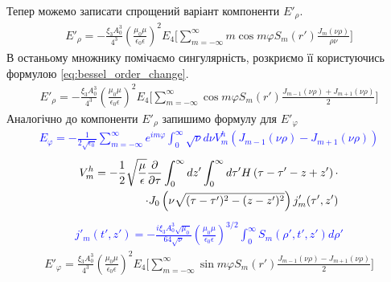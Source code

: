 %
Тепер можемо записати спрощений варіант 
компоненти $ E'_\rho $.
%
\begin{equation*} \begin{aligned}
E'_\rho = - \frac{\xi_3 A_0^3}{4^3}
\left( \frac{\mu_0 \mu} {\epsilon_0 \epsilon} \right)^2
E_4 \Big[ \sum_{m=-\infty}^\infty m \cos m \varphi 
S_m (r') \frac{J_m(\nu \rho)}{\rho \nu} \Big]
\end{aligned} \end{equation*}
%
В останьому множнику помічаємо сингулярність, розкриємо її користуючись
формулою \eqref{eq:bessel_order_change}.
%
\begin{equation*} \begin{aligned}
E'_\rho = - \frac{\xi_3 A_0^3}{4^3}
\left( \frac{\mu_0 \mu} {\epsilon_0 \epsilon} \right)^2
E_4 \Big[ \sum_{m=-\infty}^\infty \cos m \varphi 
S_m (r') \frac{J_{m-1}(\nu \rho) + J_{m+1}(\nu \rho)}{2} \Big]
\end{aligned} \end{equation*}
%
Аналогічно до компоненти $ E'_\rho $ запишимо формулу для $ E'_\varphi $
%
\textcolor{blue} { \begin{equation*} \begin{aligned}
E_\varphi = - \frac{1}{2 \sqrt{\epsilon_0}} \sum_{m=-\infty}^{\infty} 
e^{im\varphi} \int_{0}^{\infty} \sqrt{\nu} d \nu 
V_m^h \left( J_{m-1} (\nu \rho) - J_{m+1} (\nu \rho) \right)
\end{aligned} \end{equation*} }
%
\textcolor{blue} { \begin{equation*} \begin{aligned} 
V_m^h = - \frac{1}{2} \sqrt{\frac{\mu}{\epsilon}} \frac{\partial }{\partial \tau} 
\int_0^\infty dz' \int_0^\infty d \tau'
H \left( \tau - \tau' - z + z' \right) \cdot \\
\cdot J_0 \left( \nu \sqrt{(\tau-\tau')^2 - (z-z')^2} \right) j'_m (\tau',z')
\end{aligned} \end{equation*} }
%
\textcolor{blue} { \begin{equation*} \begin{aligned}
j'_m (t',z') =  - \frac{i \xi_3 A_0^3 \sqrt{\mu_0}}{64 \sqrt{\nu}}
\left( \frac{\mu_0 \mu} {\epsilon_0 \epsilon} \right)^{3/2}
\int_{0}^{\infty} S_m (\rho',t',z') d \rho'
\end{aligned} \end{equation*} }
%
\begin{equation*} \begin{aligned}
E'_\varphi = \frac{\xi_3 A_0^3}{4^3}
\left( \frac{\mu_0 \mu} {\epsilon_0 \epsilon} \right)^2
E_4 \Big[ \sum_{m=-\infty}^\infty 
\sin m \varphi S_m (r')
\frac{J_{m-1}(\nu \rho) - J_{m+1}(\nu \rho)}{2} \Big]
\end{aligned} \end{equation*}
